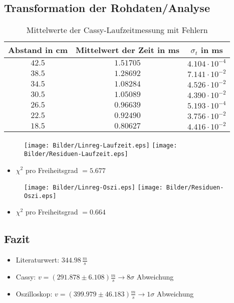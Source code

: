 \documentclass[11pt]{beamer}
\begin{document}
\subsection{Transformation der Rohdaten/Analyse}
\begin{frame}
\begin{table}[H]\centering
\caption{Mittelwerte der Cassy-Laufzeitmessung mit Fehlern}
\begin{tabular}{c|c|c}
Abstand in cm & Mittelwert der Zeit in ms & $\sigma_t$ in ms\\ 
\hline
$42.5$& $1.51705$& $4.104 \cdot 10^{-4}$\\ 
$38.5$& $1.28692$& $7.141 \cdot 10^{-2}$\\
$34.5$& $1.08284$& $4.526 \cdot 10^{-2}$\\
$30.5$& $1.05089$& $4.390 \cdot 10^{-2}$\\
$26.5$& $0.96639$& $5.193 \cdot 10^{-4}$\\
$22.5$& $0.92490$& $3.756 \cdot 10^{-2}$\\
$18.5$& $0.80627$& $4.416 \cdot 10^{-2}$\\
\end{tabular} 
\end{table}
\end{frame}
\begin{frame}
\begin{figure}[H]
\texttt{[image: Bilder/Linreg-Laufzeit.eps]}
\texttt{[image: Bilder/Residuen-Laufzeit.eps]}
\end{figure}
\begin{itemize}
\item $\chi^2$ pro Freiheitsgrad $=5.677$
\end{itemize}
\end{frame}
\begin{frame}
\begin{figure}[H]
\centering
\texttt{[image: Bilder/Linreg-Oszi.eps]}
\texttt{[image: Bilder/Residuen-Oszi.eps]}
\end{figure}
\begin{itemize}
\item $\chi^2$ pro Freiheitsgrad $=0.664$
\end{itemize}
\end{frame}
\subsection{Fazit}
\begin{frame}
\begin{itemize}
\item Literaturwert: $344.98 \, \frac{m}{s}$
\item Cassy: $v=(291.878 \pm 6.108) \frac{m}{s} \rightarrow 8\sigma$ Abweichung
\item Oszilloskop: $v=(399.979 \pm 46.183)\frac{m}{s}\rightarrow 1\sigma$ Abweichung
\end{itemize}
\end{frame}
\end{document}
